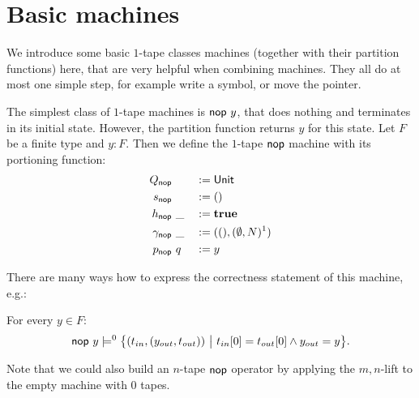 \documentclass{psartcl}
\begin{document}
\section{Basic machines}


We introduce some basic $1$-tape classes machines (together with their partition functions) here, that are very helpful when combining machines.
They all do at most one simple step, for example write a symbol, or move the pointer.

The simplest class of $1$-tape machines is $\textsf{nop}~y$, that does nothing and terminates in its initial state.  However, the partition function
returns $y$ for this state.
Let $F$ be a finite type and $y : F$.
Then we define the $1$-tape $\textsf{nop}$ machine with its portioning function:
\begin{alignat*}{3}
  Q_     {\textsf{nop}} &~  &&:= \textsf{Unit} \\
  s_     {\textsf{nop}} &~  &&:= \mathbf{()} \\
  h_     {\textsf{nop}} &~\_&&:= \mathbf{true} \\
  \gamma_{\textsf{nop}} &~\_&&:= (\mathbf{()}, (\emptyset, N)^1) \\
  p_     {\textsf{nop}} &~q &&:= y
\end{alignat*}

There are many ways how to express the correctness statement of this machine, e.g.:
\begin{lemma}
  \label{lem:nop-tm}
  For every $y \in F$:
  $$\textsf{nop}~y \models^0 \bigl\{ (t_{in}, (y_{out}, t_{out}))~\big|~t_{in}[0] = t_{out}[0] \land y_{out} = y \bigr \}.$$
\end{lemma}
Note that we could also build an $n$-tape $\textsf{nop}$ operator by applying the $m,n$-lift to the empty machine with $0$ tapes.
\end{document}
